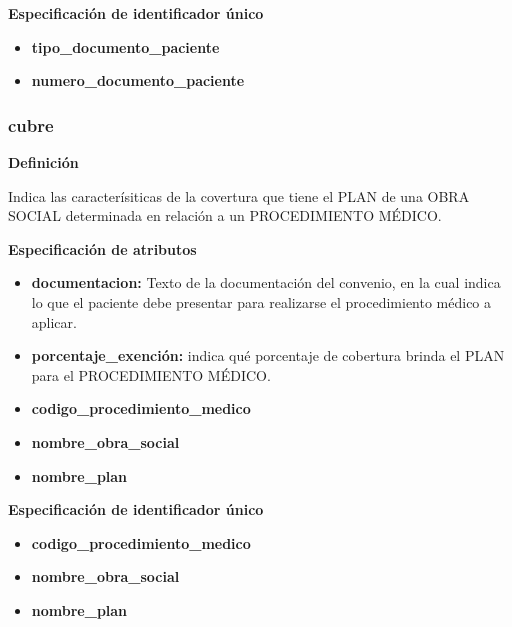 \documentclass[a4paper,11pt]{article}
\begin{document}
\textbf{Especificación de identificador único}

\begin{itemize}

     \item \textbf{tipo\_documento\_paciente}

     \item \textbf{numero\_documento\_paciente}

\end{itemize}

\subsubsection{\textbf{cubre}}

\textbf{Definición}

Indica las caracterísiticas de la covertura que tiene el PLAN de una 
OBRA SOCIAL determinada en relación a un PROCEDIMIENTO MÉDICO.

\textbf{Especificación de atributos}

\begin{itemize}

     \item \textbf{documentacion:} Texto de la documentación del convenio, en la cual 
     indica lo que el paciente debe presentar para realizarse el procedimiento médico 
     a aplicar.

     \item \textbf{porcentaje\_exención:} indica qué porcentaje de cobertura brinda
     el PLAN para el PROCEDIMIENTO MÉDICO.

     \item \textbf{codigo\_procedimiento\_medico}

     \item \textbf{nombre\_obra\_social} 

     \item \textbf{nombre\_plan}
	 
\end{itemize}

\textbf{Especificación de identificador único}

\begin{itemize}

     \item \textbf{codigo\_procedimiento\_medico}

     \item \textbf{nombre\_obra\_social}

     \item \textbf{nombre\_plan}

\end{itemize}
\end{document}
